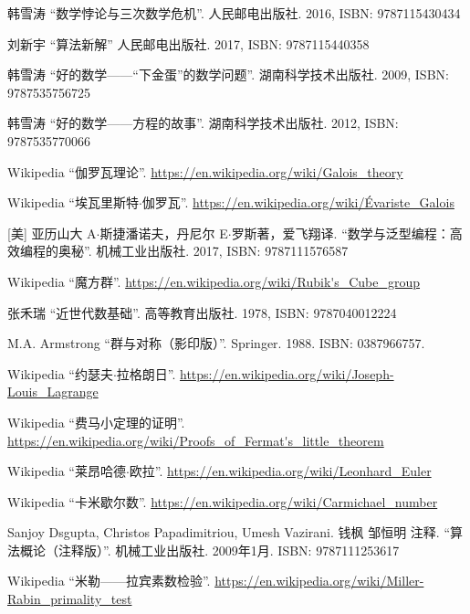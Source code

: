 \documentclass{article}
\begin{document}
\ifx\wholebook\relax \else
\begin{thebibliography}{99}

韩雪涛 ``数学悖论与三次数学危机''. 人民邮电出版社. 2016, ISBN: 9787115430434

刘新宇 ``算法新解'' 人民邮电出版社. 2017, ISBN: 9787115440358

韩雪涛 ``好的数学——“下金蛋”的数学问题''. 湖南科学技术出版社. 2009, ISBN: 9787535756725

韩雪涛 ``好的数学——方程的故事''. 湖南科学技术出版社. 2012, ISBN: 9787535770066

Wikipedia ``伽罗瓦理论''. \url{https://en.wikipedia.org/wiki/Galois_theory}

Wikipedia ``埃瓦里斯特$\cdot$伽罗瓦''. \url{https://en.wikipedia.org/wiki/Évariste_Galois}

[美] 亚历山大 A$\cdot$斯捷潘诺夫，丹尼尔 E$\cdot$罗斯著，爱飞翔译. ``数学与泛型编程：高效编程的奥秘''. 机械工业出版社. 2017, ISBN: 9787111576587

Wikipedia ``魔方群''. \url{https://en.wikipedia.org/wiki/Rubik's_Cube_group}

张禾瑞 ``近世代数基础''. 高等教育出版社. 1978, ISBN: 9787040012224

M.A. Armstrong ``群与对称（影印版）''. Springer. 1988. ISBN: 0387966757.

Wikipedia ``约瑟夫$\cdot$拉格朗日''. \url{https://en.wikipedia.org/wiki/Joseph-Louis_Lagrange}

Wikipedia ``费马小定理的证明''. \url{https://en.wikipedia.org/wiki/Proofs_of_Fermat's_little_theorem}

Wikipedia ``莱昂哈德$\cdot$欧拉''. \url{https://en.wikipedia.org/wiki/Leonhard_Euler}

Wikipedia ``卡米歇尔数''. \url{https://en.wikipedia.org/wiki/Carmichael_number}

Sanjoy Dsgupta, Christos Papadimitriou, Umesh Vazirani. 钱枫 邹恒明 注释. ``算法概论（注释版）''. 机械工业出版社. 2009年1月. ISBN: 9787111253617

Wikipedia ``米勒——拉宾素数检验''. \url{https://en.wikipedia.org/wiki/Miller-Rabin_primality_test}


\end{thebibliography}
\end{document}
